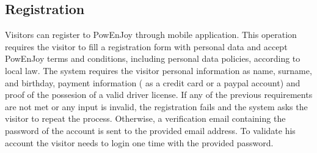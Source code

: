 \subsection{Registration}
Visitors can register to PowEnJoy through mobile application. This operation requires the visitor to fill a registration form with personal data and accept PowEnJoy terms and conditions, including personal data policies, according to local law. The system requires the visitor personal information as name, surname, and birthday, payment information ( as a credit card or a paypal account) and proof of the possesion of a valid driver license.
If any of the previous requirements are not met or any input is invalid, the registration fails and the system asks the visitor to repeat the process. Otherwise, a verification email containing the password of the account is sent to the provided email address. To validate his account the visitor needs to login one time with the provided password.
